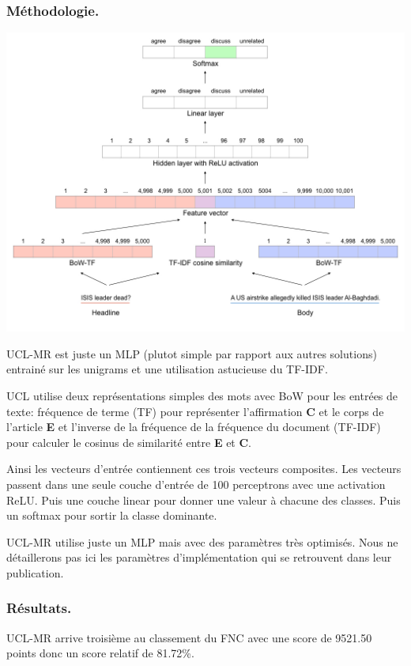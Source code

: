\documentclass[onecolumn, 12pt]{article}
\begin{document}
\subsubsection{Méthodologie.}
\begin{center}
 \includegraphics[scale=0.35]{../../img/model/uclmr/uclmr_model.png}
 \label{fig4}
\end{center}
UCL-MR est juste un MLP (plutot simple par rapport aux autres solutions) entrainé sur les unigrams et une utilisation astucieuse du TF-IDF.

UCL utilise deux représentations simples des mots avec BoW pour les entrées de texte: fréquence de terme (TF) pour représenter l'affirmation \textbf{C} et le corps de l'article \textbf{E} et l'inverse de la fréquence de la fréquence du document (TF-IDF) pour calculer le cosinus de similarité entre \textbf{E} et \textbf{C}.

Ainsi les vecteurs d'entrée contiennent ces trois vecteurs composites.
Les vecteurs passent dans une seule couche d'entrée de 100 perceptrons avec une activation ReLU.
Puis une couche linear pour donner une valeur à chacune des classes.
Puis un softmax pour sortir la classe dominante.

UCL-MR utilise juste un MLP mais avec des paramètres très optimisés.
Nous ne détaillerons pas ici les paramètres d'implémentation qui se retrouvent dans leur publication.
\subsubsection{Résultats.}
UCL-MR arrive troisième au classement du FNC avec une score de 9521.50 points donc un score relatif de 81.72\%.
\end{document}
